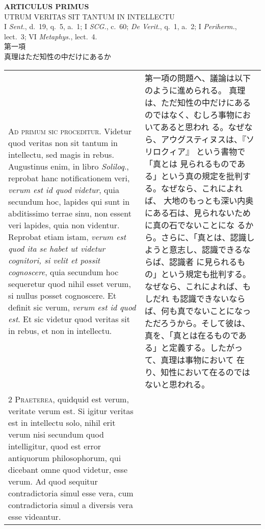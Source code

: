 \documentclass[10pt]{jsarticle} %
\begin{document}
\newpage

\begin{center}
 {\Large {\bf ARTICULUS PRIMUS}}\\
 {\large UTRUM VERITAS SIT TANTUM IN INTELLECTU}\\
 {\footnotesize I {\itshape Sent.}, d.~19, q.~5, a.~1; I {\itshape
 SCG.}, c.~60; {\itshape De Verit.}, q.~1, a.~2; I {\itshape Periherm.},
 lect.~3; VI {\itshape Metaphys.}, lect.~4.}\\
 {\Large 第一項\\真理はただ知性の中だけにあるか}
\end{center}

\begin{longtable}{p{21em}p{21em}}



{\huge A}{\scshape d primum sic proceditur}. Videtur quod veritas non
sit tantum in intellectu, sed magis in rebus. Augustinus enim, in libro
{\itshape Soliloq}., reprobat hanc notificationem veri, {\itshape verum
est id quod videtur}, quia secundum hoc, lapides qui sunt in abditissimo
terrae sinu, non essent veri lapides, quia non videntur. Reprobat etiam
istam, {\itshape verum est quod ita se habet ut videtur cognitori, si
velit et possit cognoscere}, quia secundum hoc sequeretur quod nihil
esset verum, si nullus posset cognoscere. Et definit sic verum,
{\itshape verum est id quod est}. Et sic videtur quod veritas sit in
rebus, et non in intellectu.

&

第一項の問題へ、議論は以下のように進められる。
真理は、ただ知性の中だけにあるのではなく、むしろ事物においてあると思われ
る。なぜなら、アウグスティヌスは、『ソリロクィア』 という書物で「真とは
 見られるものである」という真の規定を批判する。なぜなら、これによれば、
 大地のもっとも深い内奥にある石は、見られないために真の石でないことにな
 るから。さらに、「真とは、認識しようと意志し、認識できるならば、認識者
 に見られるもの」という規定も批判する。なぜなら、これによれば、もしだれ
 も認識できないならば、何も真でないことになっただろうから。そして彼は、
真を、「真とは在るものである」と定義する。したがって、真理は事物において
 在り、知性において在るのではないと思われる。

\\


{\scshape 2 Praeterea}, quidquid est verum, veritate
verum est. Si igitur veritas est in intellectu solo, nihil erit verum
nisi secundum quod intelligitur, quod est error antiquorum
philosophorum, qui dicebant omne quod videtur, esse verum. Ad quod
sequitur contradictoria simul esse vera, cum contradictoria simul a
diversis vera esse videantur.



\end{longtable}
\end{document}

